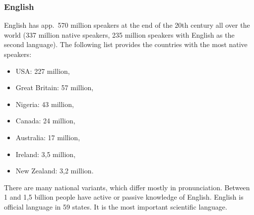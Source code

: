 \subsubsection{English}

English has app.\ 570 million speakers at the end of the 20th century all over the world (337
million native speakers, 235 million speakers with English as the second language). The following
list provides the countries with the most native speakers: 
\begin{itemize}
\item USA: 227 million,
\item Great Britain: 57 million,
\item Nigeria: 43 million, 
\item Canada: 24 million,
\item Australia: 17 million,
\item Ireland: 3,5 million,
\item New Zealand: 3,2 million.
\end{itemize}
There are many national variants, which differ mostly in pronunciation.
Between 1 and  1,5 billion people have active or passive knowledge of English.
English is official language in 59 states. It is the most important scientific language.




